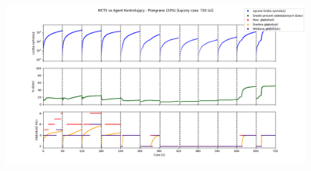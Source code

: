     \begin{figure}[H]
        \center
        \includegraphics[width=\textwidth]{imgs/plots/MCTS_CA_LOST.png}
    \end{figure}


